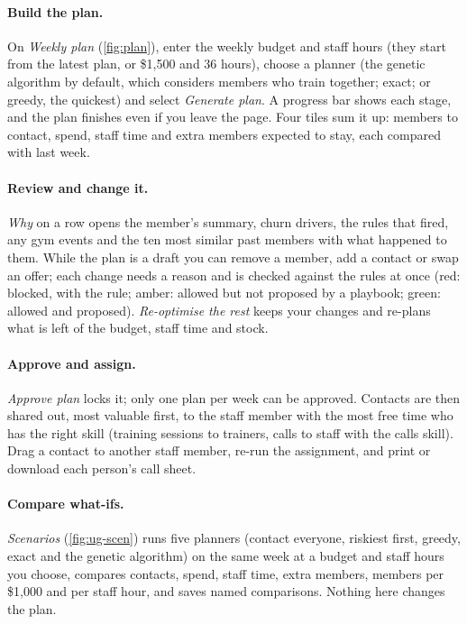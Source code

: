 \paragraph{Build the plan.} On \emph{Weekly plan} (\cref{fig:plan}), enter the weekly budget and staff hours (they start from the latest plan, or \$1,500 and 36 hours), choose a planner (the genetic algorithm by default, which considers members who train together; exact; or greedy, the quickest) and select \emph{Generate plan}. A progress bar shows each stage, and the plan finishes even if you leave the page. Four tiles sum it up: members to contact, spend, staff time and extra members expected to stay, each compared with last week.

\paragraph{Review and change it.} \emph{Why} on a row opens the member's summary, churn drivers, the rules that fired, any gym events and the ten most similar past members with what happened to them. While the plan is a draft you can remove a member, add a contact or swap an offer; each change needs a reason and is checked against the rules at once (red: blocked, with the rule; amber: allowed but not proposed by a playbook; green: allowed and proposed). \emph{Re-optimise the rest} keeps your changes and re-plans what is left of the budget, staff time and stock.

\paragraph{Approve and assign.} \emph{Approve plan} locks it; only one plan per week can be approved. Contacts are then shared out, most valuable first, to the staff member with the most free time who has the right skill (training sessions to trainers, calls to staff with the calls skill). Drag a contact to another staff member, re-run the assignment, and print or download each person's call sheet.

\paragraph{Compare what-ifs.} \emph{Scenarios} (\cref{fig:ug-scen}) runs five planners (contact everyone, riskiest first, greedy, exact and the genetic algorithm) on the same week at a budget and staff hours you choose, compares contacts, spend, staff time, extra members, members per \$1,000 and per staff hour, and saves named comparisons. Nothing here changes the plan.

